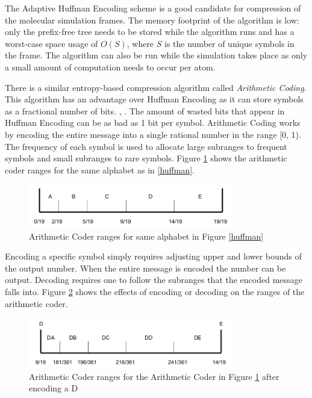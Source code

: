 \documentclass[a4paper,11pt]{report}
\begin{document}
The Adaptive Huffman Encoding scheme is a good candidate for compression of the molecular simulation frames. The memory footprint of the algorithm is low: only the prefix-free tree needs to be stored while the algorithm runs and has a worst-case space usage of $O(S)$, where $S$ is the number of unique symbols in the frame. The algorithm can also be run while the simulation takes place as only a small amount of computation needs to occur per atom.

There is a similar entropy-based compression algorithm called \emph{Arithmetic Coding}. This algorithm has an advantage over Huffman Encoding as it can store symbols as a fractional number of bits. \cite{RefWorks:1}, \cite{RefWorks:3}. The amount of wasted bits that appear in Huffman Encoding can be as bad as 1 bit per symbol. Arithmetic Coding works by encoding the entire message into a single rational number in the range [0, 1). The frequency of each symbol is used to allocate large subranges to frequent symbols and small subranges to rare symbols. Figure \ref{arithmeticcoder} shows the arithmetic coder ranges for the same alphabet as in \ref{huffman}.

\begin{figure}[!h]
 \center
 \includegraphics[width=0.8\textwidth]{resources/ArithmeticCoder.png}
\caption{Arithmetic Coder ranges for same alphabet in Figure \ref{huffman}}
\label{arithmeticcoder}
\end{figure}

Encoding a specific symbol simply requires adjusting upper and lower bounds of the output number. When the entire message is encoded the number can be output. Decoding requires one to follow the subranges that the encoded message falls into. Figure \ref{arithmeticcodersubrange} shows the effects of encoding or decoding on the ranges of the arithmetic coder.

\begin{figure}[!h]
 \center
 \includegraphics[width=0.8\textwidth]{resources/ArithmeticCoderSubrange.png}
\caption{Arithmetic Coder ranges for the Arithmetic Coder in Figure \ref{arithmeticcoder} after encoding a D}
\label{arithmeticcodersubrange}
\end{figure}
\end{document}
